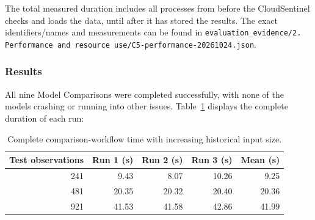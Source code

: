 The total measured duration includes all processes from before the CloudSentinel checks and loads the data, until after it has stored the results. The exact identifiers/names and measurements can be found in \texttt{evaluation\_evidence/2. Performance and resource use/C5-performance-20261024.json}.

\subsubsection{Results}

All nine Model Comparisons were completed successfully, with none of the models crashing or running into other issues. Table~\ref{tab:h9-input-scaling-results} displays the complete duration of each run:

\begin{table}[H]
    \centering
    \small
    \caption{Complete comparison-workflow time with increasing historical input size.}
    \label{tab:h9-input-scaling-results}
    \begin{tabular}{|r|r|r|r|r|}
        \hline
        Test observations & Run 1 (s) & Run 2 (s) & Run 3 (s) & Mean (s) \\
        \hline
        241 & 9.43 & 8.07 & 10.26 & 9.25 \\
        481 & 20.35 & 20.32 & 20.40 & 20.36 \\
        921 & 41.53 & 41.58 & 42.86 & 41.99 \\
        \hline
    \end{tabular}
\end{table}




